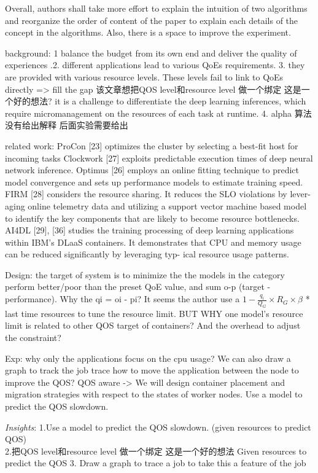 \documentclass[UTF8]{article}
\begin{document}
Overall, authors shall take more effort to explain the intuition of two algorithms and reorganize the order of content of the paper to explain each details of the concept in the algorithms. Also, there is a space to improve the experiment.

background: 1 balance the budget from its own end and deliver the quality of experiences .2. different applications lead to various QoEs requirements. 3. they are provided with various resource levels. These levels fail to link to QoEs directly => fill the gap 该文章想把QOS level和resource level 做一个绑定 这是一个好的想法? it is a challenge to differentiate the deep learning inferences, which require micromanagement on the resources of each task at runtime. 4. alpha 算法没有给出解释 后面实验需要给出

related work: ProCon [23] optimizes the cluster by selecting a best-fit host for incoming tasks Clockwork [27] exploits predictable execution times of deep neural network inference. Optimus [26] employs an online fitting technique to predict model convergence and sets up performance models to estimate training speed.  FIRM [28] considers the resource sharing. It reduces the SLO violations by lever- aging online telemetry data and utilizing a support vector machine based model to identify the key components that are likely to become resource bottlenecks. AI4DL [29], [36] studies the training processing of deep learning applications within IBM’s DLaaS containers. It demonstrates that CPU and memory usage can be reduced significantly by leveraging typ- ical resource usage patterns.

Design: the target of system is to minimize the the models in the category perform better/poor than the preset QoE value, and sum o-p (target - performance).  Why the qi = oi - pi?  It seems the author use a $1− \frac{q_i}{Q_G}×R_G ×β$ * last time resources to tune the resource limit. BUT WHY one model's resource limit is related to other QOS target of containers? And the overhead to adjust the constraint? 

Exp: why only the applications focus on the cpu usage? We can also draw a graph to track the job trace  how to move the application between the node to improve the QOS? QOS aware -> We will design container placement and migration strategies with respect to the states of worker nodes.  Use a model to predict the QOS slowdown.

\emph{Insights}: 
1.Use a model to predict the QOS slowdown. (given resources to predict QOS) \\
2.把QOS level和resource level 做一个绑定 这是一个好的想法 Given resources to predict the QOS
3. Draw a graph to trace a job to take this a feature of the job
\end{document}
